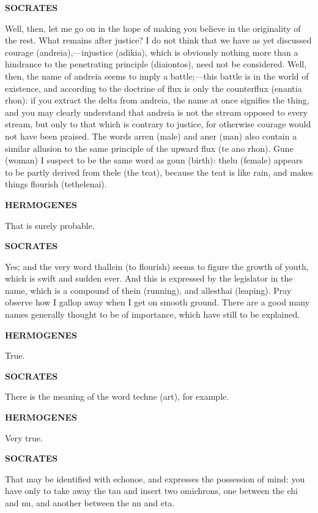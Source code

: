 \documentclass[11pt,letter]{article}
\begin{document}
\par \textbf{SOCRATES}
\par   Well, then, let me go on in the hope of making you believe in the originality of the rest. What remains after justice? I do not think that we have as yet discussed courage (andreia),—injustice (adikia), which is obviously nothing more than a hindrance to the penetrating principle (diaiontos), need not be considered. Well, then, the name of andreia seems to imply a battle;—this battle is in the world of existence, and according to the doctrine of flux is only the counterflux (enantia rhon):  if you extract the delta from andreia, the name at once signifies the thing, and you may clearly understand that andreia is not the stream opposed to every stream, but only to that which is contrary to justice, for otherwise courage would not have been praised. The words arren (male) and aner (man) also contain a similar allusion to the same principle of the upward flux (te ano rhon). Gune (woman) I suspect to be the same word as goun (birth):  thelu (female) appears to be partly derived from thele (the teat), because the teat is like rain, and makes things flourish (tethelenai).

\par \textbf{HERMOGENES}
\par   That is surely probable.

\par \textbf{SOCRATES}
\par   Yes; and the very word thallein (to flourish) seems to figure the growth of youth, which is swift and sudden ever. And this is expressed by the legislator in the name, which is a compound of thein (running), and allesthai (leaping). Pray observe how I gallop away when I get on smooth ground. There are a good many names generally thought to be of importance, which have still to be explained.

\par \textbf{HERMOGENES}
\par   True.

\par \textbf{SOCRATES}
\par   There is the meaning of the word techne (art), for example.

\par \textbf{HERMOGENES}
\par   Very true.

\par \textbf{SOCRATES}
\par   That may be identified with echonoe, and expresses the possession of mind:  you have only to take away the tau and insert two omichrons, one between the chi and nu, and another between the nu and eta.
\end{document}
